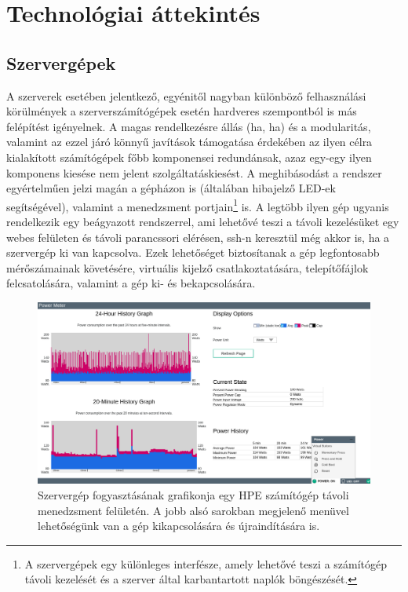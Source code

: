 
\chapter{Technológiai áttekintés}
\label{chap:technologies}

\section{Szervergépek}
\label{sect:servers}
A szerverek esetében jelentkező, egyénitől nagyban különböző felhasználási körülmények a szerverszámítógépek esetén hardveres szempontból is más felépítést igényelnek. A magas rendelkezésre állás (\acrlong{ha}, \acrshort{ha}) és a modularitás, valamint az ezzel járó könnyű javítások támogatása érdekében az ilyen célra kialakított számítógépek főbb komponensei redundánsak, azaz egy-egy ilyen komponens kiesése nem jelent szolgáltatáskiesést. A meghibásodást a rendszer egyértelműen jelzi magán a gépházon is (általában hibajelző LED-ek segítségével), valamint a menedzsment portjain\footnote{A szervergépek egy különleges interfésze, amely lehetővé teszi a számítógép távoli kezelését és a szerver által karbantartott naplók böngészését.} is. A legtöbb ilyen gép ugyanis rendelkezik egy beágyazott rendszerrel, ami lehetővé teszi a távoli kezelésüket egy webes felületen és távoli parancssori elérésen, \acrshort{ssh}-n keresztül még akkor is, ha a szervergép ki van kapcsolva. Ezek lehetőséget biztosítanak a gép legfontosabb mérőszámainak követésére, virtuális kijelző csatlakoztatására, telepítőfájlok felcsatolására, valamint a gép ki- és bekapcsolására.

\begin{figure}[!ht]
	\centering
	\includegraphics[width=150mm, keepaspectratio]{figures/ilo-power1.png}
	\caption{Szervergép fogyasztásának grafikonja egy HPE számítógép távoli menedzsment felületén. A jobb alsó sarokban megjelenő menüvel lehetőségünk van a gép kikapcsolására és újraindítására is.}
	\label{fig:ilopowerchart}
\end{figure}

